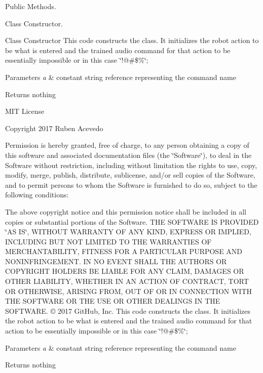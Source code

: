 Public Methods. 

Class Constructor.

Class Constructor This code constructs the class. It initializes the robot action to be what is entered and the trained audio command for that action to be essentially impossible or in this case \char`\"{}!@\#\$\%\char`\"{}; 
\begin{DoxyParams}{Parameters}
{\em a} & constant string reference representing the command name \\
\hline
\end{DoxyParams}
\begin{DoxyReturn}{Returns}
nothing
\end{DoxyReturn}
M\+IT License

Copyright 2017 Ruben Acevedo

Permission is hereby granted, free of charge, to any person obtaining a copy of this software and associated documentation files (the \char`\"{}\+Software\char`\"{}), to deal in the Software without restriction, including without limitation the rights to use, copy, modify, merge, publish, distribute, sublicense, and/or sell copies of the Software, and to permit persons to whom the Software is furnished to do so, subject to the following conditions\+:

The above copyright notice and this permission notice shall be included in all copies or substantial portions of the Software. T\+HE S\+O\+F\+T\+W\+A\+RE IS P\+R\+O\+V\+I\+D\+ED \char`\"{}\+A\+S I\+S\char`\"{}, W\+I\+T\+H\+O\+UT W\+A\+R\+R\+A\+N\+TY OF A\+NY K\+I\+ND, E\+X\+P\+R\+E\+SS OR I\+M\+P\+L\+I\+ED, I\+N\+C\+L\+U\+D\+I\+NG B\+UT N\+OT L\+I\+M\+I\+T\+ED TO T\+HE W\+A\+R\+R\+A\+N\+T\+I\+ES OF M\+E\+R\+C\+H\+A\+N\+T\+A\+B\+I\+L\+I\+TY, F\+I\+T\+N\+E\+SS F\+OR A P\+A\+R\+T\+I\+C\+U\+L\+AR P\+U\+R\+P\+O\+SE A\+ND N\+O\+N\+I\+N\+F\+R\+I\+N\+G\+E\+M\+E\+NT. IN NO E\+V\+E\+NT S\+H\+A\+LL T\+HE A\+U\+T\+H\+O\+RS OR C\+O\+P\+Y\+R\+I\+G\+HT H\+O\+L\+D\+E\+RS BE L\+I\+A\+B\+LE F\+OR A\+NY C\+L\+A\+IM, D\+A\+M\+A\+G\+ES OR O\+T\+H\+ER L\+I\+A\+B\+I\+L\+I\+TY, W\+H\+E\+T\+H\+ER IN AN A\+C\+T\+I\+ON OF C\+O\+N\+T\+R\+A\+CT, T\+O\+RT OR O\+T\+H\+E\+R\+W\+I\+SE, A\+R\+I\+S\+I\+NG F\+R\+OM, O\+UT OF OR IN C\+O\+N\+N\+E\+C\+T\+I\+ON W\+I\+TH T\+HE S\+O\+F\+T\+W\+A\+RE OR T\+HE U\+SE OR O\+T\+H\+ER D\+E\+A\+L\+I\+N\+GS IN T\+HE S\+O\+F\+T\+W\+A\+RE. © 2017 Git\+Hub, Inc. This code constructs the class. It initializes the robot action to be what is entered and the trained audio command for that action to be essentially impossible or in this case \char`\"{}!@\#\$\%\char`\"{}; 
\begin{DoxyParams}{Parameters}
{\em a} & constant string reference representing the command name \\
\hline
\end{DoxyParams}
\begin{DoxyReturn}{Returns}
nothing 
\end{DoxyReturn}


